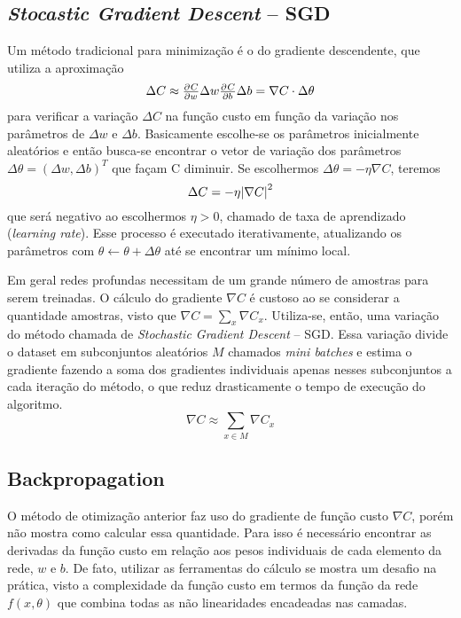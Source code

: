 \subsection{\textit{Stocastic Gradient Descent} -- SGD}
Um método tradicional para minimização é o do gradiente descendente, que utiliza a aproximação
\begin{equation}
\Delta C \approx \pd{C}{w} \Delta w \pd{C}{b} \Delta b = \nabla C \cdot \Delta \theta
\end{equation}
para verificar a variação $\Delta C$ na função custo em função da variação nos parâmetros de $\Delta w$ e $\Delta b$. Basicamente escolhe-se os parâmetros inicialmente aleatórios e então busca-se encontrar o vetor de variação dos parâmetros $\Delta \theta = (\Delta w, \Delta b)^T$ que façam C diminuir. Se escolhermos $\Delta \theta = -\eta \nabla C$, teremos
\begin{equation}
\Delta C = -\eta \abs{\nabla C}^2
\end{equation}
que será negativo ao escolhermos $\eta > 0$, chamado de taxa de aprendizado (\textit{learning rate}). Esse processo é executado iterativamente, atualizando os parâmetros com $\theta \gets \theta + \Delta \theta$ até se encontrar um mínimo local.

Em geral redes profundas necessitam de um grande número de amostras para serem treinadas. O cálculo do gradiente $\nabla C$ é custoso ao se considerar a quantidade amostras, visto que $\nabla C = \sum_x \nabla C_x$. Utiliza-se, então, uma variação do método chamada de \textit{Stochastic Gradient Descent} -- SGD. Essa variação divide o dataset em subconjuntos aleatórios $M$ chamados \textit{mini batches} e estima o gradiente fazendo a soma dos gradientes individuais apenas nesses subconjuntos a cada iteração do método, o que reduz drasticamente o tempo de execução do algoritmo.
\begin{equation}
\nabla C \approx \sum_{x \in M} \nabla C_x
\end{equation}

\subsection{Backpropagation}

O método de otimização anterior faz uso do gradiente de função custo $\nabla C$, porém não mostra como calcular essa quantidade. Para isso é necessário encontrar as derivadas da função custo em relação aos pesos individuais de cada elemento da rede, $w$ e $b$. De fato, utilizar as ferramentas do cálculo se mostra um desafio na prática, visto a complexidade da função custo em termos da função da rede $f(x, \theta)$ que combina todas as não linearidades encadeadas nas camadas. 


